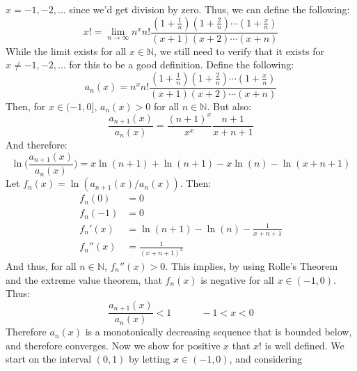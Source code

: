         $x=\minus{1},\minus{2},\dots$ since we'd get division by zero.
        Thus, we can define the following:
        \begin{equation}
            x!=\underset{n\rightarrow\infty}{\lim}n^{x}n!
                \frac{(1+\frac{1}{n})(1+\frac{2}{n})\cdots(1+\frac{x}{n})}
                     {(x+1)(x+2)\cdots(x+n)}
        \end{equation}
        While the limit exists for all $x\in\mathbb{N}$, we still need to
        verify that it exists for $x\ne\minus{1},\minus{2},\dots$ for this
        to be a good definition. Define the following:
        \begin{equation}
            a_{n}(x)=n^{x}n!
                \frac{(1+\frac{1}{n})(1+\frac{2}{n})\cdots(1+\frac{x}{n})}
                     {(x+1)(x+2)\cdots(x+n)}
        \end{equation}
        Then, for $x\in(-1,0]$, $a_{n}(x)>0$ for all $n\in\mathbb{N}$.
        But also:
        \begin{equation}
            \frac{a_{n+1}(x)}{a_{n}(x)}=
            \frac{(n+1)^{x}}{x^{x}}\frac{n+1}{x+n+1}
        \end{equation}
        And therefore:
        \begin{equation}
            \ln\Big(\frac{a_{n+1}(x)}{a_{n}(x)}\Big)=
            x\ln(n+1)+\ln(n+1)-x\ln(n)-\ln(x+n+1)
        \end{equation}
        Let $f_{n}(x)=\ln(a_{n+1}(x)/a_{n}(x))$. Then:
        \begin{align}
            f_{n}(0)&=0\\
            f_{n}(-1)&=0\\
            f_{n}'(x)&=\ln(n+1)-\ln(n)-\frac{1}{x+n+1}\\
            f_{n}''(x)&=\frac{1}{(x+n+1)^{2}}
        \end{align}
        And thus, for all $n\in\mathbb{N}$, $f_{n}''(x)>0$.
        This implies, by using Rolle's Theorem and the extreme value
        theorem, that $f_{n}(x)$ is negative for all $x\in(-1,0)$.
        Thus:
        \begin{equation}
            \frac{a_{n+1}(x)}{a_{n}(x)}<1
            \quad\quad\quad
            \minus{1}<x<0
        \end{equation}
        Therefore $a_{n}(x)$ is a monotonically decreasing sequence
        that is bounded below, and therefore converges. Now we show for
        positive $x$ that $x!$ is well defined. We start on the interval
        $(0,1)$ by letting $x\in(\minus{1},0)$, and considering
